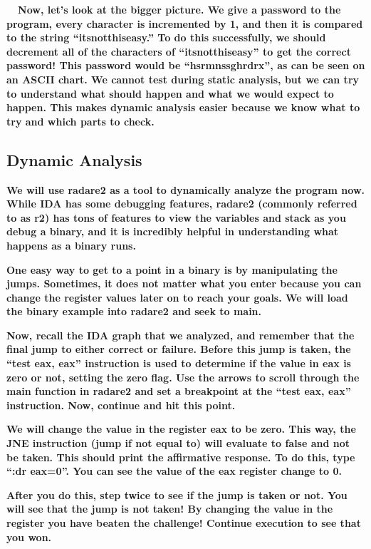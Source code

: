 \textbf{ \ \ Now, let's look at the bigger picture. We give a password to the program, every character is incremented by
1, and then it is compared to the string ``itsnotthiseasy.'' To do this successfully, we should decrement all of the
characters of ``itsnotthiseasy'' to get the correct password! This password would be
``hsrmnssghrd{\textasciigrave}rx'', as can be seen on an ASCII chart. We cannot test during static analysis, but we can
try to understand what should happen and what we would expect to happen. This makes dynamic analysis easier because we
know what to try and which parts to check.}

\subsection{Dynamic Analysis}

\textbf{We will use radare2 as a tool to dynamically analyze the program now. While IDA has some debugging features,
radare2 (commonly referred to as r2) has tons of features to view the variables and stack as you debug a binary, and it
is incredibly helpful in understanding what happens as a binary runs.}

\textbf{One easy way to get to a point in a binary is by manipulating the jumps. Sometimes, it does not matter what you
enter because you can change the register values later on to reach your goals. We will load the binary example into
radare2 and seek to main.}

  
 \textbf{Now, recall the IDA graph that we analyzed, and remember that the final jump to either correct or failure.
Before this jump is taken, the ``test eax, eax'' instruction is used to determine if the value in eax is zero or not,
setting the zero flag. Use the arrows to scroll through the main function in radare2 and set a breakpoint at the ``test
eax, eax'' instruction. Now, continue and hit this point.}

  
 \textbf{We will change the value in the register eax to be zero. This way, the JNE instruction (jump if not equal to)
will evaluate to false and not be taken. This should print the affirmative response. To do this, type ``:dr eax=0''.
You can see the value of the eax register change to 0. }  
 

\textbf{After you do this, step twice to see if the jump is taken or not. You will see that the jump is not taken! By
changing the value in the register you have beaten the challenge! Continue execution to see that you won.}

